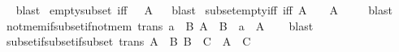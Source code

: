 \begin{isabellebody}
\isadelimproof
\ %
\endisadelimproof
%
\isatagproof
{}\isamarkupfalse%
\ blast%
\endisatagproof
{\isafoldproof}%
%
\isadelimproof
%
\endisadelimproof
\isanewline
\isanewline
{}\isamarkupfalse%
\ empty{\isacharunderscore}{\kern0pt}subset\ {\isacharbrackleft}{\kern0pt}iff{\isacharbrackright}{\kern0pt}{\isacharcolon}{\kern0pt}\ {\isachardoublequoteopen}{\isacharbraceleft}{\kern0pt}{\isacharbraceright}{\kern0pt}\ {\isasymsubseteq}\ A{\isachardoublequoteclose}%
\isadelimproof
\ %
\endisadelimproof
%
\isatagproof
{}\isamarkupfalse%
\ blast%
\endisatagproof
{\isafoldproof}%
%
\isadelimproof
%
\endisadelimproof
\isanewline
\isanewline
{}\isamarkupfalse%
\ subset{\isacharunderscore}{\kern0pt}empty{\isacharunderscore}{\kern0pt}iff\ {\isacharbrackleft}{\kern0pt}iff{\isacharbrackright}{\kern0pt}{\isacharcolon}{\kern0pt}\ {\isachardoublequoteopen}A\ {\isasymsubseteq}\ {\isacharbraceleft}{\kern0pt}{\isacharbraceright}{\kern0pt}\ {\isasymlongleftrightarrow}\ A\ {\isacharequal}{\kern0pt}\ {\isacharbraceleft}{\kern0pt}{\isacharbraceright}{\kern0pt}{\isachardoublequoteclose}%
\isadelimproof
\ %
\endisadelimproof
%
\isatagproof
{}\isamarkupfalse%
\ blast%
\endisatagproof
{\isafoldproof}%
%
\isadelimproof
%
\endisadelimproof
\isanewline
\isanewline
{}\isamarkupfalse%
\ not{\isacharunderscore}{\kern0pt}mem{\isacharunderscore}{\kern0pt}if{\isacharunderscore}{\kern0pt}subset{\isacharunderscore}{\kern0pt}if{\isacharunderscore}{\kern0pt}not{\isacharunderscore}{\kern0pt}mem\ {\isacharbrackleft}{\kern0pt}trans{\isacharbrackright}{\kern0pt}{\isacharcolon}{\kern0pt}\ {\isachardoublequoteopen}{\isasymlbrakk}a\ {\isasymnotin}\ B{\isacharsemicolon}{\kern0pt}\ A\ {\isasymsubseteq}\ B{\isasymrbrakk}\ {\isasymLongrightarrow}\ a\ {\isasymnotin}\ A{\isachardoublequoteclose}\isanewline
%
\isadelimproof
\ \ %
\endisadelimproof
%
\isatagproof
{}\isamarkupfalse%
\ blast%
\endisatagproof
{\isafoldproof}%
%
\isadelimproof
\isanewline
%
\endisadelimproof
\isanewline
{}\isamarkupfalse%
\ subset{\isacharunderscore}{\kern0pt}if{\isacharunderscore}{\kern0pt}subset{\isacharunderscore}{\kern0pt}if{\isacharunderscore}{\kern0pt}subset\ {\isacharbrackleft}{\kern0pt}trans{\isacharbrackright}{\kern0pt}{\isacharcolon}{\kern0pt}\ {\isachardoublequoteopen}{\isasymlbrakk}A\ {\isasymsubseteq}\ B{\isacharsemicolon}{\kern0pt}\ B\ {\isasymsubseteq}\ C{\isasymrbrakk}\ {\isasymLongrightarrow}\ A\ {\isasymsubseteq}\ C{\isachardoublequoteclose}\isanewline
%
\isadelimproof
\ \ %
\endisadelimproof
%
\isatagproof

\end{isabellebody}

